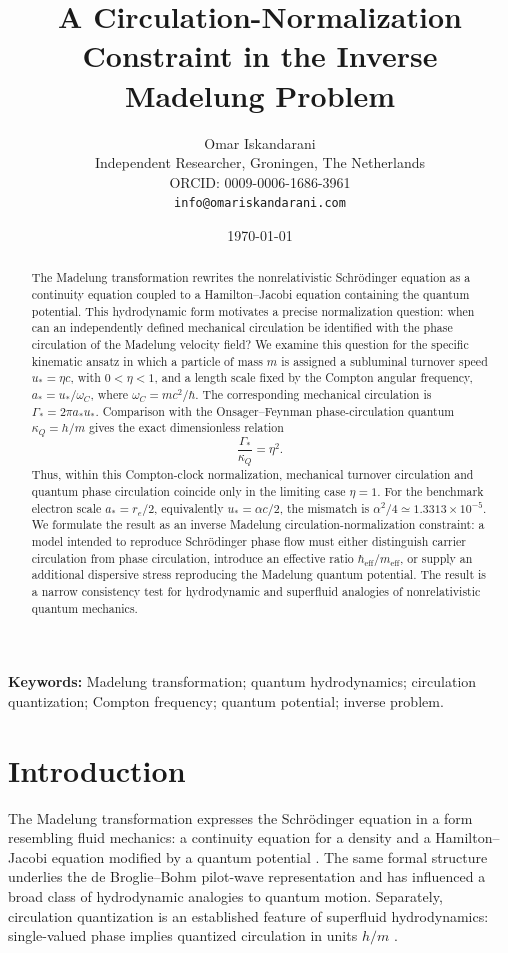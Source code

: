 \documentclass[11pt,a4paper]{article}
\title{\textbf{A Circulation-Normalization Constraint in the Inverse Madelung Problem}}
\author{Omar Iskandarani\\
\small Independent Researcher, Groningen, The Netherlands\\
\small ORCID: 0009-0006-1686-3961\\
\small \texttt{info@omariskandarani.com}}
\date{\today}
\begin{document}
\maketitle

\begin{abstract}
The Madelung transformation rewrites the nonrelativistic Schr\"odinger equation as a continuity equation coupled to a Hamilton--Jacobi equation containing the quantum potential. This hydrodynamic form motivates a precise normalization question: when can an independently defined mechanical circulation be identified with the phase circulation of the Madelung velocity field? We examine this question for the specific kinematic ansatz in which a particle of mass $m$ is assigned a subluminal turnover speed $u_*=\eta c$, with $0<\eta<1$, and a length scale fixed by the Compton angular frequency, $a_*=u_*/\omega_C$, where $\omega_C=mc^2/\hbar$. The corresponding mechanical circulation is $\Gamma_* = 2\pi a_* u_*$. Comparison with the Onsager--Feynman phase-circulation quantum $\kappa_Q=h/m$ gives the exact dimensionless relation
\begin{equation*}
    \frac{\Gamma_*}{\kappa_Q}=\eta^2.
\end{equation*}
Thus, within this Compton-clock normalization, mechanical turnover circulation and quantum phase circulation coincide only in the limiting case $\eta=1$. For the benchmark electron scale $a_*=r_e/2$, equivalently $u_*=\alpha c/2$, the mismatch is $\alpha^2/4 \simeq 1.3313\times10^{-5}$. We formulate the result as an inverse Madelung circulation-normalization constraint: a model intended to reproduce Schr\"odinger phase flow must either distinguish carrier circulation from phase circulation, introduce an effective ratio $\hbar_{\mathrm{eff}}/m_{\mathrm{eff}}$, or supply an additional dispersive stress reproducing the Madelung quantum potential. The result is a narrow consistency test for hydrodynamic and superfluid analogies of nonrelativistic quantum mechanics.
\end{abstract}

\noindent\textbf{Keywords:} Madelung transformation; quantum hydrodynamics; circulation quantization; Compton frequency; quantum potential; inverse problem.

\section{Introduction}

The Madelung transformation expresses the Schr\"odinger equation in a form resembling fluid mechanics: a continuity equation for a density and a Hamilton--Jacobi equation modified by a quantum potential \cite{Madelung1927,Schrodinger1926,Takabayasi1952,Holland1993}. The same formal structure underlies the de Broglie--Bohm pilot-wave representation \cite{Bohm1952a,Bohm1952b} and has influenced a broad class of hydrodynamic analogies to quantum motion. Separately, circulation quantization is an established feature of superfluid hydrodynamics: single-valued phase implies quantized circulation in units $h/m$ \cite{Onsager1949,Feynman1955,Donnelly1991}. 
\end{document}
